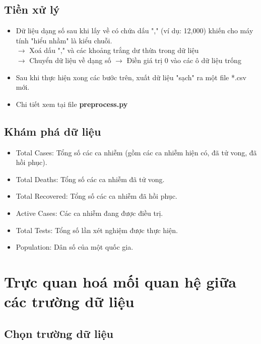 \documentclass[a4paper, 12pt]{article}
\begin{document}
    \subsection{Tiền xử lý}

    \begin{itemize}
        \item Dữ liệu dạng số sau khi lấy về có chứa dấu "," (ví dụ: 12,000) khiến cho máy tính "hiểu nhầm" là kiểu chuỗi.\\
        $\rightarrow$ Xoá dấu "," và các khoảng trắng dư thừa trong dữ liệu\\
        $\rightarrow$ Chuyển dữ liệu về dạng số
        $\rightarrow$ Điền giá trị 0 vào các ô dữ liệu trống

        \item Sau khi thực hiện xong các bước trên, xuất dữ liệu "sạch" ra một file *.csv mới.
        \item Chi tiết xem tại file \textbf{preprocess.py}
    \end{itemize}

    \subsection{Khám phá dữ liệu}

    \begin{itemize}
        \item Total Cases: Tổng số các ca nhiễm (gồm các ca nhiễm hiện có, đã tử vong, đã hồi phục).
        \item Total Deaths: Tổng số các ca nhiễm đã tử vong.
        \item Total Recovered: Tổng số các ca nhiễm đã hồi phục.
        \item Active Cases: Các ca nhiễm đang được điều trị.
        \item Total Tests: Tổng số lần xét nghiệm được thực hiện.
        \item Population: Dân số của một quốc gia.
    \end{itemize}

    \clearpage 

    \section{Trực quan hoá mối quan hệ giữa các trường dữ liệu}

    \subsection{Chọn trường dữ liệu}
\end{document}
